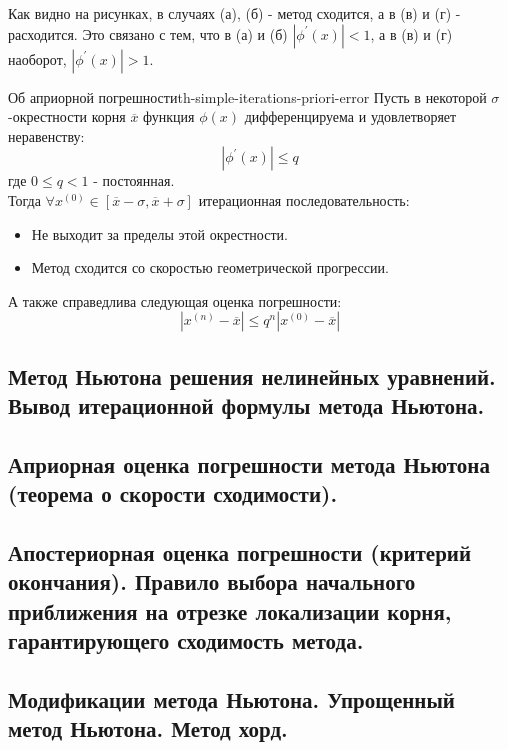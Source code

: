 \documentclass[14pt]{extarticle}
\begin{document}
        Как видно на рисунках, в случаях (а), (б) - метод сходится, а в (в) и (г) - расходится. Это связано с тем, что в (а) и (б) $|\phi^{'}(x)| < 1$, а в (в) и (г) наоборот, $|\phi^{'}(x)| > 1$.

        \begin{theorem}{Об априорной погрешности}{th-simple-iterations-priori-error}
            Пусть в некоторой $\sigma$-окрестности корня $\overline{x}$ функция $\phi(x)$ дифференцируема и удовлетворяет неравенству:
            $$|\phi^{'}(x)| \leq q$$
            где $0 \leq q < 1$ - постоянная.\\

            Тогда $\forall x^{(0)} \in [\overline{x} - \sigma, \overline{x} + \sigma]$ итерационная последовательность:
            \begin{itemize}
                \item Не выходит за пределы этой окрестности.
                \item Метод сходится со скоростью геометрической прогрессии. 
            \end{itemize}
            А также справедлива следующая оценка погрешности:
            $$|x^{(n)} - \overline{x}| \leq q^{n}|x^{(0)} - \overline{x}|$$
        \end{theorem}

\clearpage
\subsection{Метод Ньютона решения нелинейных уравнений. Вывод итерационной формулы метода Ньютона.}

\clearpage
\subsection{Априорная оценка погрешности метода Ньютона (теорема о скорости сходимости).}

\clearpage
\subsection{Апостериорная оценка погрешности (критерий окончания). Правило выбора начального приближения на отрезке локализации корня, гарантирующего сходимость метода.}

\clearpage
\subsection{Модификации метода Ньютона. Упрощенный метод Ньютона. Метод хорд.}
\end{document}
